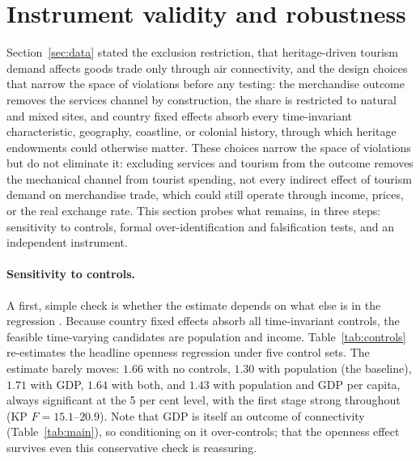 \section{Instrument validity and robustness}
\label{sec:robust}
Section~\ref{sec:data} stated the exclusion restriction, that heritage-driven
tourism demand affects goods trade only through air connectivity, and the
design choices that narrow the space of violations before any testing: the
merchandise outcome removes the services channel by construction, the share
is restricted to natural and mixed sites, and country fixed effects absorb
every time-invariant characteristic, geography, coastline, or colonial
history, through which heritage endowments could otherwise matter. These
choices narrow the space of violations but do not eliminate it: excluding
services and tourism from the outcome removes the mechanical channel from
tourist spending, not every indirect effect of tourism demand on merchandise
trade, which could still operate through income, prices, or the real
exchange rate. This
section probes what remains, in three steps: sensitivity to controls, formal
over-identification and falsification tests, and an independent instrument.

\paragraph{Sensitivity to controls.} A first, simple check is whether the
estimate depends on what else is in the regression \citep[cf.][]{Frankel_1999}.
Because country fixed effects absorb all time-invariant controls, the feasible
time-varying candidates are population and income. Table~\ref{tab:controls}
re-estimates the headline openness regression under five control sets. The
estimate barely moves: $1.66$ with no controls, $1.30$ with population (the
baseline), $1.71$ with GDP, $1.64$ with both, and $1.43$ with population and
GDP per capita, always significant at the 5 per cent level, with the first
stage strong throughout (KP $F=15.1$--$20.9$). Note that GDP is itself an
outcome of connectivity (Table~\ref{tab:main}), so conditioning on it
over-controls; that the openness effect survives even this conservative check
is reassuring.

